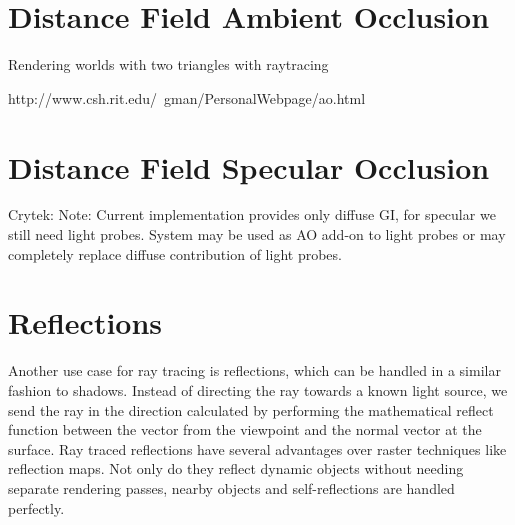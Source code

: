 






\chapter{Distance Field Ambient Occlusion}
Rendering worlds with two triangles with raytracing





http://www.csh.rit.edu/~gman/PersonalWebpage/ao.html




\chapter{Distance Field Specular Occlusion}

Crytek:
Note: Current implementation provides only diffuse GI, for specular we still need light probes. System may be used as AO add-on to light probes or may completely replace diffuse contribution of light probes.


\chapter{Reflections}
Another use case for ray tracing is reflections, which can be handled in a similar fashion to shadows. Instead of directing the ray towards a known light source, we send the ray in the direction calculated by performing the mathematical reflect function between the vector from the viewpoint and the normal vector at the surface. Ray traced reflections have several advantages over raster techniques like reflection maps.  Not only do they reflect dynamic objects without needing separate rendering passes, nearby objects and self-reflections are handled perfectly.






